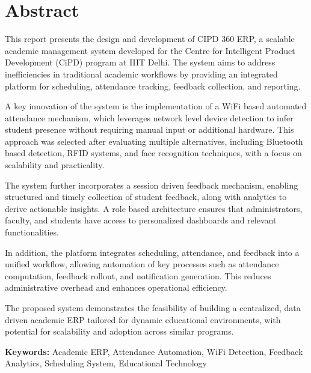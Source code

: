 \chapter*{Abstract}

This report presents the design and development of CIPD 360 ERP, a scalable academic management
system developed for the Centre for Intelligent Product Development (CiPD) program at IIIT Delhi.
The system aims to address inefficiencies in traditional academic workflows by providing an
integrated platform for scheduling, attendance tracking, feedback collection, and reporting.

A key innovation of the system is the implementation of a WiFi based automated attendance
mechanism, which leverages network level device detection to infer student presence without
requiring manual input or additional hardware. This approach was selected after evaluating multiple
alternatives, including Bluetooth based detection, RFID systems, and face recognition techniques,
with a focus on scalability and practicality.

The system further incorporates a session driven feedback mechanism, enabling structured and
timely collection of student feedback, along with analytics to derive actionable insights. A role based
architecture ensures that administrators, faculty, and students have access to personalized
dashboards and relevant functionalities.

In addition, the platform integrates scheduling, attendance, and feedback into a unified workflow,
allowing automation of key processes such as attendance computation, feedback rollout, and
notification generation. This reduces administrative overhead and enhances operational efficiency.

The proposed system demonstrates the feasibility of building a centralized, data driven academic ERP
tailored for dynamic educational environments, with potential for scalability and adoption across
similar programs.

\vspace{0.4cm}
\noindent\textbf{Keywords:} Academic ERP, Attendance Automation, WiFi Detection, Feedback Analytics, Scheduling
System, Educational Technology

\newpage
